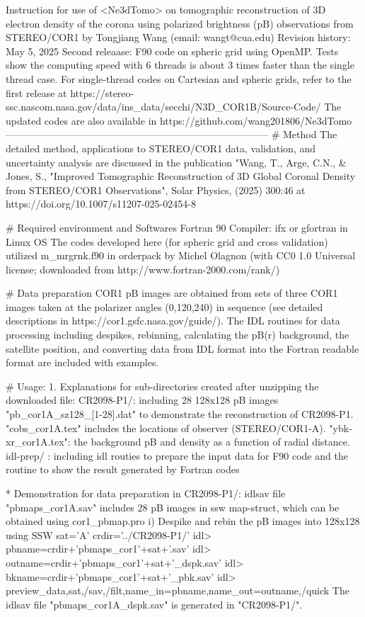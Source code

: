 Instruction for use of <Ne3dTomo> on tomographic reconstruction of 
 3D electron density of the corona using polarized brightness (pB) observations 
 from STEREO/COR1
 by Tongjiang Wang (email: wangt@cua.edu)
Revision history:
  May 5, 2025 Second releaase: F90 code on spheric grid using OpenMP. Tests show the
computing speed with 6 threads is about 3 times faster than the single thread case.
For single-thread codes on Cartesian and spheric grids, refer to the first release
at https://stereo-ssc.nascom.nasa.gov/data/ins_data/secchi/N3D_COR1B/Source-Code/
The updated codes are also available in https://github.com/wang201806/Ne3dTomo
--------------------------------------------------------------------------------
 # Method
 The detailed method, applications to STEREO/COR1 data, validation, and uncertainty 
 analysis are discussed in the publication "Wang, T., Arge, C.N., & Jones, S., 
 "Improved Tomographic Reconstruction of 3D Global Coronal Density from STEREO/COR1 
 Observations", Solar Physics, (2025) 300:46 at https://doi.org/10.1007/s11207-025-02454-8

 # Required environment and Softwares
  Fortran 90 Compiler: ifx or gfortran in Linux OS
  The codes developed here (for spheric grid and cross validation) utilized m_mrgrnk.f90 
  in orderpack by Michel Olagnon (with CC0 1.0 Universal license; downloaded
  from http://www.fortran-2000.com/rank/)

 # Data preparation
   COR1 pB images are obtained from sets of three COR1 images taken at the polarizer angles
  (0,120,240) in sequence (see detailed descriptions in https://cor1.gsfc.nasa.gov/guide/).
   The IDL routines for data processing including despikes, rebinning, calculating the pB(r)
   background, the satellite position, and converting data from IDL format into the Fortran 
   readable format are included with examples.

 # Usage:
   1. Explanations for sub-directories created after unzipping the downloaded file:
    CR2098-P1/: including 28 128x128 pB images "pb_cor1A_sz128_[1-28].dat" to demonstrate the
           reconstruction of CR2098-P1. "cobs_cor1A.tex" includes the locations of 
           observer (STEREO/COR1-A).  "ybk-xr_cor1A.tex": the background pB and density as a
           function of radial distance.
    idl-prep/  : including idl routies to prepare the input data for F90 code and the routine 
           to show the result generated by Fortran codes

     * Demonstration for data preparation
       in CR2098-P1/: idlsav file "pbmaps_cor1A.sav" includes 28 pB images in ssw map-struct,
         which can be obtained using cor1_pbmap.pro
      i) Despike and rebin the pB images into 128x128 using SSW 
      sat='A'
      crdir='../CR2098-P1/'
      idl> pbname=crdir+'pbmaps_cor1'+sat+'.sav'
      idl> outname=crdir+'pbmaps_cor1'+sat+'_dspk.sav'
      idl> bkname=crdir+'pbmaps_cor1'+sat+'_pbk.sav'
      idl> preview_data,sat,/sav,/filt,name_in=pbname,name_out=outname,/quick
      The idlsav file "pbmaps_cor1A_dspk.sav" is generated in "CR2098-P1/".

